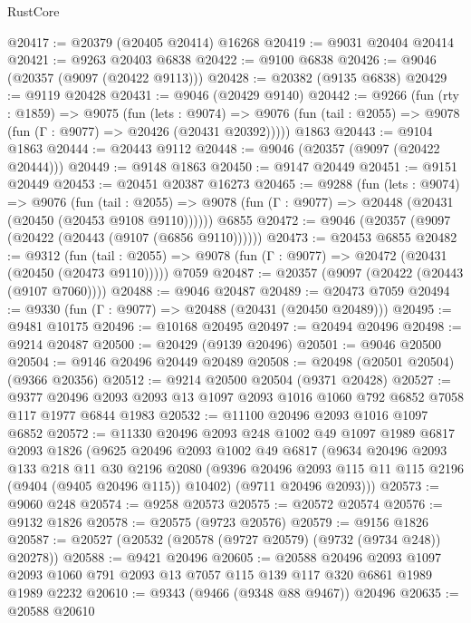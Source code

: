\begin{lexlean}{RustCore}
\begin{coremodule}
@20417 := @20379 (@20405 @20414) @16268
@20419 := @9031 @20404 @20414
@20421 := @9263 @20403 @6838
@20422 := @9100 @6838
@20426 := @9046 (@20357 (@9097 (@20422 @9113)))
@20428 := @20382 (@9135 @6838)
@20429 := @9119 @20428
@20431 := @9046 (@20429 @9140)
@20442 := @9266
    (fun (rty : @1859) =>
    @9075
      (fun (lets : @9074) =>
      @9076 (fun (tail : @2055) => @9078 (fun (Γ : @9077) => @20426 (@20431 @20392)))))
    @1863
@20443 := @9104 @1863
@20444 := @20443 @9112
@20448 := @9046 (@20357 (@9097 (@20422 @20444)))
@20449 := @9148 @1863
@20450 := @9147 @20449
@20451 := @9151 @20449
@20453 := @20451 @20387 @16273
@20465 := @9288
    (fun (lets : @9074) =>
    @9076
      (fun (tail : @2055) =>
      @9078 (fun (Γ : @9077) => @20448 (@20431 (@20450 (@20453 @9108 @9110))))))
    @6855
@20472 := @9046 (@20357 (@9097 (@20422 (@20443 (@9107 (@6856 @9110))))))
@20473 := @20453 @6855
@20482 := @9312
    (fun (tail : @2055) => @9078 (fun (Γ : @9077) => @20472 (@20431 (@20450 (@20473 @9110)))))
    @7059
@20487 := @20357 (@9097 (@20422 (@20443 (@9107 @7060))))
@20488 := @9046 @20487
@20489 := @20473 @7059
@20494 := @9330 (fun (Γ : @9077) => @20488 (@20431 (@20450 @20489)))
@20495 := @9481 @10175
@20496 := @10168 @20495
@20497 := @20494 @20496
@20498 := @9214 @20487
@20500 := @20429 (@9139 @20496)
@20501 := @9046 @20500
@20504 := @9146 @20496 @20449 @20489
@20508 := @20498 (@20501 @20504) (@9366 @20356)
@20512 := @9214 @20500 @20504 (@9371 @20428)
@20527 := @9377
    @20496
    @2093
    @2093
    @13
    @1097
    @2093
    @1016
    @1060
    @792
    @6852
    @7058
    @117
    @1977
    @6844
    @1983
@20532 := @11100 @20496 @2093 @1016 @1097 @6852
@20572 := @11330
    @20496
    @2093
    @248
    @1002
    @49
    @1097
    @1989
    @6817
    @2093
    @1826
    (@9625
      @20496
      @2093
      @1002
      @49
      @6817
      (@9634
        @20496
        @2093
        @133
        @218
        @11
        @30
        @2196
        @2080
        (@9396 @20496 @2093 @115 @11 @115 @2196 (@9404 (@9405 @20496 @115)) @10402)
        (@9711 @20496 @2093)))
@20573 := @9060 @248
@20574 := @9258 @20573
@20575 := @20572 @20574
@20576 := @9132 @1826
@20578 := @20575 (@9723 @20576)
@20579 := @9156 @1826
@20587 := @20527 (@20532 (@20578 (@9727 @20579) (@9732 (@9734 @248)) @20278))
@20588 := @9421 @20496
@20605 := @20588
    @20496
    @2093
    @1097
    @2093
    @1060
    @791
    @2093
    @13
    @7057
    @115
    @139
    @117
    @320
    @6861
    @1989
    @1989
    @2232
@20610 := @9343 (@9466 (@9348 @88 @9467)) @20496
@20635 := @20588
    @20610

\end{coremodule}
\end{lexlean}

